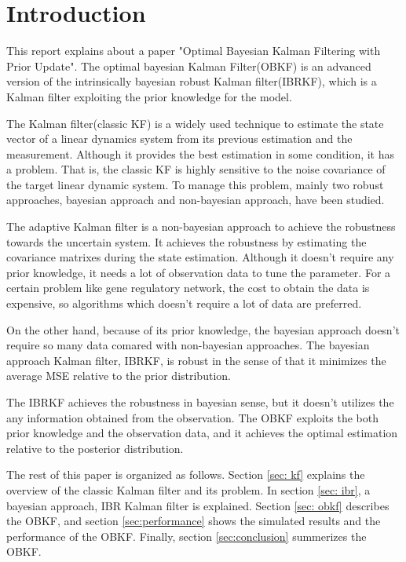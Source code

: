 \section{Introduction\label{introduction}}

This report explains about a paper "Optimal Bayesian Kalman Filtering with Prior Update"\cite{Dehghannasiri2018}. 
The optimal bayesian Kalman Filter(OBKF) is an advanced version of the intrinsically bayesian robust Kalman filter(IBRKF)\cite{Dehghannasiri2017}, which is a Kalman filter exploiting the prior knowledge for the model.

The Kalman filter(classic KF)\cite{Kalman1960} is a widely used technique to estimate the state vector of a linear dynamics system from its previous estimation and the measurement. Although it provides the best estimation in some condition, it has a problem. 
That is, the classic KF is highly sensitive to the noise covariance of the target linear dynamic system\cite{Sangsuk-Iam1990}. To manage this problem, mainly two robust approaches, bayesian approach and non-bayesian approach, have been studied. 

The adaptive Kalman filter\cite{Myers1976}\cite{Mehra1972} is a non-bayesian approach to achieve the robustness towards the uncertain system. It achieves the robustness by estimating the covariance matrixes during the state estimation. Although it doesn't require any prior knowledge, it needs a lot of observation data to tune the parameter. For a certain problem like gene regulatory network, the cost to obtain the data is expensive, so algorithms which doesn't require a lot of data are preferred.

On the other hand, because of its prior knowledge, the bayesian approach doesn't require so many data comared with non-bayesian approaches. The bayesian approach Kalman filter, IBRKF, is robust in the sense of that it minimizes the average MSE relative to the prior distribution. 

The IBRKF achieves the robustness in bayesian sense, but it doesn't utilizes the any information obtained from the observation. The OBKF exploits the both prior knowledge and the observation data, and it achieves the optimal estimation relative to the posterior distribution.

The rest of this paper is organized as follows. Section \ref{sec: kf} explains the overview of the classic Kalman filter and its problem. In section \ref{sec: ibr}, a bayesian approach, IBR Kalman filter is explained. Section \ref{sec: obkf} describes the OBKF, and section \ref{sec:performance} shows the simulated results and the performance of the OBKF. Finally, section \ref{sec:conclusion} summerizes the OBKF.
